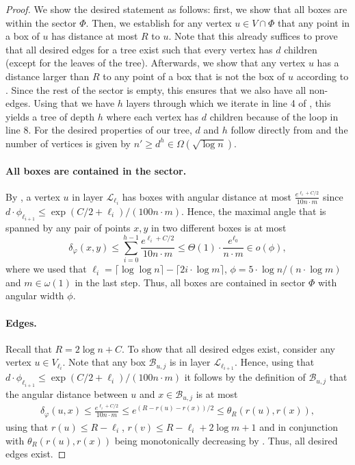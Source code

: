 \documentclass[letterpaper,11pt]{article}
\newcommand{\1}{\mathbb I}
\newcommand{\Layer}[1]{\mathcal{L}_{#1}}
\newcommand{\angulardist}[2]{\delta_\varphi(#1,#2)}
\newcommand{\boxbelow}[2]{\mathcal{B}_{#1, #2}}
\begin{document}
%
\begin{proof}
    We show the desired statement as follows: first, we show that all boxes are within the sector $\Phi$. Then, we establish for any vertex $u \in V \cap \Phi$ that any point in a box of $u$ has distance at most $R$ to $u$. Note that this already suffices to prove that all desired edges for a tree exist such that every vertex has $d$ children (except for the leaves of the tree). Afterwards, we show that any vertex $u$ has a distance larger than $R$ to any point of a box that is not the box of $u$ according to . Since the rest of the sector is empty, this ensures that we also have all non-edges. Using that we have $h$ layers through which we iterate in line 4 of , this yields a tree of depth $h$ where each vertex has $d$ children because of the loop in line 8. For the desired properties of our tree, $d$ and $h$ follow directly from  and the number of vertices is given by $n' \geq d^{h} \in \Omega(\sqrt{\log n})$.

    \paragraph{All boxes are contained in the sector.} By , a vertex $u$ in layer $\Layer{\ell_i}$ has boxes with angular distance at most $\frac{e^{\ell_i + C/2}}{10 n\cdot m}$ since $d\cdot \phi_{\ell_{i+1}} \leq \exp(C/2 + \ell_i)/(100n\cdot m)$. Hence, the maximal angle that is spanned by any pair of points $x,y$ in two different boxes is at most 
%
    $$
    \angulardist{x}{y} \leq \sum_{i=0}^{h-1} \frac{e^{\ell_i + C/2}}{10 n\cdot m} \leq \Theta(1)\cdot \frac{e^{\ell_0}}{n\cdot m} \in o(\phi),  
    $$
%
where we used that $\ell_i =  \lceil \log\log n \rceil - \lceil 2i \cdot {\log m} \rceil$, $\phi = 5\cdot \log n / (n\cdot \log m)$ and $m \in \omega(1)$ in the last step. Thus, all boxes are contained in sector $\Phi$ with angular width $\phi$.

    \paragraph{Edges.} Recall that $R = 2\log n + C$. To show that all desired edges exist, consider any vertex $u \in V_{\ell_{i}}$. Note that any box $\boxbelow{u}{j}$ is in layer $\Layer{\ell_{i+1}}$. Hence, using that $d\cdot \phi_{\ell_{i+1}} \leq \exp(C/2 + \ell_i)/(100n\cdot m)$ it follows by the definition of $\boxbelow{u}{j}$ that the angular distance between $u$ and $x \in \boxbelow{u}{j}$ is at most 
    \begin{align*}
    \angulardist{u}{x} \leq \frac{e^{\ell_i + C/2}}{10 n\cdot m} \leq e^{(R - r(u) - r(x))/2} \leq \theta_R(r(u), r(x)),
    \end{align*}
using that $r(u) \leq R - \ell_i$, $r(v) \leq R - \ell_i + 2\log m + 1$ and  in conjunction with $\theta_R(r(u), r(x))$ being monotonically decreasing by . Thus, all desired edges exist.


\end{proof}
\end{document}
